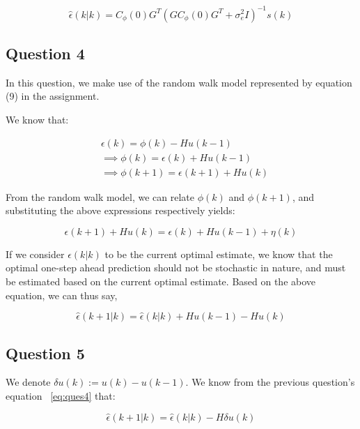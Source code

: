 \documentclass[12pt]{report}
\begin{document}
\begin{equation*}
\hat\epsilon(k|k) = C_{\phi}(0)G^{T}(GC_{\phi}(0)G^{T} + \sigma_{e}^{2}I)^{-1}s(k)
\end{equation*}

\subsection*{Question 4}

In this question, we make use of the random walk model represented by equation (9) in the assignment.

We know that:

\begin{equation*}
\begin{aligned}
&\epsilon(k) = \phi(k) - Hu(k-1) \\
&\implies \phi(k) = \epsilon(k) + Hu(k-1) \\
&\implies \phi(k+1) = \epsilon(k+1) + Hu(k)
\end{aligned}
\end{equation*}

From the random walk model, we can relate $\phi(k)$ and $\phi(k+1)$, and substituting the above expressions respectively yields:

\begin{equation*}
\epsilon(k+1) + Hu(k) = \epsilon(k) + Hu(k-1) + \eta(k)
\end{equation*}

If we consider $\hat\epsilon(k|k)$ to be the current optimal estimate, we know that the optimal one-step ahead prediction should not be stochastic in nature, and must be estimated based on the current optimal estimate. Based on the above equation, we can thus say,

\begin{equation}\label{eq:ques4}
\hat\epsilon(k+1|k) = \hat\epsilon(k|k) + Hu(k-1) - Hu(k)
\end{equation}

\subsection*{Question 5}

We denote $\delta u(k) := u(k) - u(k-1)$. We know from the previous question's equation ~\ref{eq:ques4} that:

\begin{equation*}
\hat\epsilon(k+1|k) = \hat\epsilon(k|k) - H\delta u(k)
\end{equation*}
\end{document}
